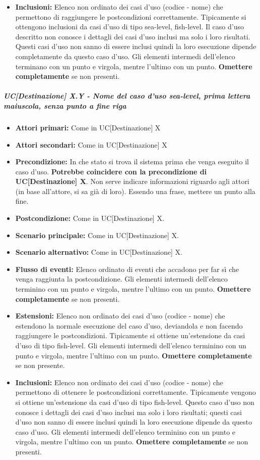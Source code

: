 \begin{itemize}
\item \textbf{Inclusioni:} Elenco non ordinato dei casi d'uso (codice - nome) che permettono di raggiungere le postcondizioni correttamente. Tipicamente si ottengono inclusioni da casi d'uso di tipo sea-level, fish-level. Il caso d'uso descritto non conosce i dettagli dei casi d'uso inclusi ma solo i loro risultati. Questi casi d'uso non sanno di essere inclusi quindi la loro esecuzione dipende completamente da questo caso d'uso. Gli elementi intermedi dell'elenco terminano con un punto e virgola, mentre l'ultimo con un punto. \textbf{Omettere completamente} se non presenti.
\end{itemize}

\subparagraph*{UC[Destinazione] X.Y - Nome del caso d'uso sea-level, prima lettera maiuscola, senza punto a fine riga}%
\begin{itemize}
	\item \textbf{Attori primari:} Come in UC[Destinazione] X
	\item \textbf{Attori secondari:} Come in UC[Destinazione] X
	\item \textbf{Precondizione:} In che stato si trova il sistema prima che venga eseguito il caso d'uso. \textbf{Potrebbe coincidere con la precondizione di UC[Destinazione] X}. Non serve indicare informazioni riguardo agli attori (in base all'attore, si sa già di loro). Essendo una frase, mettere un punto alla fine.
	\item \textbf{Postcondizione:} Come in UC[Destinazione] X.
	\item \textbf{Scenario principale:} Come in UC[Destinazione] X.
	\item \textbf{Scenario alternativo:} Come in UC[Destinazione] X.
	\item \textbf{Flusso di eventi:} Elenco ordinato di eventi che accadono per far sì che venga raggiunta la postcondizione. Gli elementi intermedi dell'elenco terminino con un punto e virgola, mentre l'ultimo con un punto. \textbf{Omettere completamente} se non presenti.
	\item \textbf{Estensioni:} Elenco non ordinato dei casi d'uso (codice - nome) che estendono la normale esecuzione del caso d'uso, deviandola e non facendo raggiungere le postcondizioni. Tipicamente si ottiene un'estensione da casi d'uso di tipo fish-level. Gli elementi intermedi dell'elenco terminino con un punto e virgola, mentre l'ultimo con un punto. \textbf{Omettere completamente} se non presente.
	\item \textbf{Inclusioni:} Elenco non ordinato dei casi d'uso (codice - nome) che permettono di ottenere le postcondizioni correttamente. Tipicamente vengono si ottiene un'estensione da casi d'uso di tipo fish-level. Questo caso d'uso non conosce i dettagli dei casi d'uso inclusi ma solo i loro risultati; questi casi d'uso non sanno di essere inclusi quindi la loro esecuzione dipende da questo caso d'uso. Gli elementi intermedi dell'elenco terminino con un punto e virgola, mentre l'ultimo con un punto.  \textbf{Omettere completamente} se non presenti.
\end{itemize}

